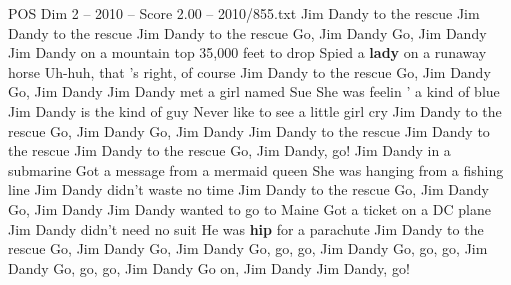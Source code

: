 \begin{textsample}{POS Dim 2 – 2010 – Score 2.00 – 2010/855.txt}  \label{ex:f2_pos_034}
Jim Dandy to the rescue Jim Dandy to the rescue Jim Dandy to the rescue Go, Jim Dandy Go, Jim Dandy Jim Dandy on a mountain top 35,000 feet to drop Spied a \textbf{lady} on a runaway horse Uh-huh, that 's right, of course Jim Dandy to the rescue Go, Jim Dandy Go, Jim Dandy Jim Dandy met a girl named Sue She was feelin ' a kind of blue Jim Dandy is the kind of guy Never like to see a little girl cry Jim Dandy to the rescue Go, Jim Dandy Go, Jim Dandy Jim Dandy to the rescue Jim Dandy to the rescue Jim Dandy to the rescue Go, Jim Dandy, go!
Jim Dandy in a submarine Got a message from a mermaid queen She was hanging from a fishing line Jim Dandy didn't waste no time Jim Dandy to the rescue Go, Jim Dandy Go, Jim Dandy Jim Dandy wanted to go to Maine Got a ticket on a DC plane Jim Dandy didn't need no suit He was \textbf{hip} for a parachute Jim Dandy to the rescue Go, Jim Dandy Go, Jim Dandy Go, go, go, Jim Dandy Go, go, go, Jim Dandy Go, go, go, Jim Dandy Go on, Jim Dandy Jim Dandy, go!

\end{textsample}
